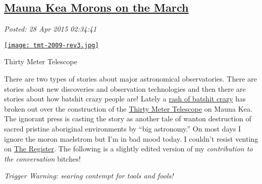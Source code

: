 %

\subsection*{\href{https://bakerjd99.wordpress.com/2015/04/27/mauna-kea-morons-on-the-march/}{Mauna Kea Morons on the March}}


\noindent\emph{Posted: 28 Apr 2015 02:34:41}
\vspace{6pt}



\captionsetup[floatingfigure]{labelformat=empty}
\begin{floatingfigure}[l]{0.25\textwidth}
\centering
\href{http://www.wired.com/2009/11/thirty-meter-telescope/}{\texttt{[image: tmt-2009-rev3.jpg]}}
\caption{Thirty Meter Telescope}
\label{fig:5014X0}
\end{floatingfigure} There are two types of stories about major astronomical observatories.
There are stories about new discoveries and observation technologies and
then there are stories about how batshit crazy people are! Lately a
\href{http://www.popsci.com/contentious-mauna-kea-telescope-website-downed-cyberattack}{rash
of batshit crazy} has broken out over the construction of the
\href{http://www.tmt.org/}{Thirty Meter Telescope} on Mauna Kea. The
ignorant press is casting the story as another tale of wanton
destruction of sacred pristine aboriginal environments by ``big
astronomy.'' On most days I ignore the moron maelstrom but I'm in bad
mood today. I couldn't resist venting on
\href{http://www.theregister.co.uk/2015/04/27/environmental_protestors_hack_hawaiian_telescope_site/}{The
Register}. The following is a slightly edited version of my
\emph{contribution to the conversation} bitches!

\medskip
\noindent\emph{Trigger Warning: searing contempt for tools and fools!}
\medskip

